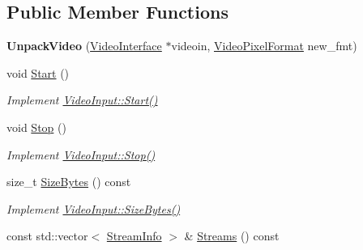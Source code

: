 \subsection*{Public Member Functions}
\begin{DoxyCompactItemize}
\item 
{\bfseries Unpack\+Video} (\hyperlink{structpangolin_1_1_video_interface}{Video\+Interface} $\ast$videoin, \hyperlink{structpangolin_1_1_video_pixel_format}{Video\+Pixel\+Format} new\+\_\+fmt)\hypertarget{classpangolin_1_1_unpack_video_aa0b5efefb32da50519dd7a0f4689e050}{}\label{classpangolin_1_1_unpack_video_aa0b5efefb32da50519dd7a0f4689e050}

\item 
void \hyperlink{classpangolin_1_1_unpack_video_a41395b8f02a046977e0befff46e41245}{Start} ()\hypertarget{classpangolin_1_1_unpack_video_a41395b8f02a046977e0befff46e41245}{}\label{classpangolin_1_1_unpack_video_a41395b8f02a046977e0befff46e41245}

\begin{DoxyCompactList}\small\item\em Implement \hyperlink{structpangolin_1_1_video_input_a74a2e3e1b87c7cbf9de9bcb39e1df128}{Video\+Input\+::\+Start()} \end{DoxyCompactList}\item 
void \hyperlink{classpangolin_1_1_unpack_video_afd5cf4e9c9f3f712b401f2ab3235f629}{Stop} ()\hypertarget{classpangolin_1_1_unpack_video_afd5cf4e9c9f3f712b401f2ab3235f629}{}\label{classpangolin_1_1_unpack_video_afd5cf4e9c9f3f712b401f2ab3235f629}

\begin{DoxyCompactList}\small\item\em Implement \hyperlink{structpangolin_1_1_video_input_a8945f80194cc7ec9594db7f27e7d09b8}{Video\+Input\+::\+Stop()} \end{DoxyCompactList}\item 
size\+\_\+t \hyperlink{classpangolin_1_1_unpack_video_a298183c1e56972585a340c4580f6a350}{Size\+Bytes} () const \hypertarget{classpangolin_1_1_unpack_video_a298183c1e56972585a340c4580f6a350}{}\label{classpangolin_1_1_unpack_video_a298183c1e56972585a340c4580f6a350}

\begin{DoxyCompactList}\small\item\em Implement \hyperlink{structpangolin_1_1_video_input_a93cee5c33386973a2a51165e6bdcf40b}{Video\+Input\+::\+Size\+Bytes()} \end{DoxyCompactList}\item 
const std\+::vector$<$ \hyperlink{classpangolin_1_1_stream_info}{Stream\+Info} $>$ \& \hyperlink{classpangolin_1_1_unpack_video_a84d5b3d20b1bf0b52d132bc8f4c204ad}{Streams} () const \hypertarget{classpangolin_1_1_unpack_video_a84d5b3d20b1bf0b52d132bc8f4c204ad}{}\label{classpangolin_1_1_unpack_video_a84d5b3d20b1bf0b52d132bc8f4c204ad}


\end{DoxyCompactItemize}
